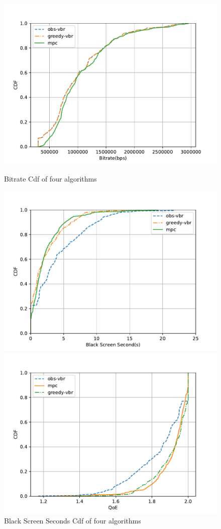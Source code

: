 \begin{figure}[htb]
  \includegraphics[width=\linewidth]{fig/massive-bitrate-cdf.pdf}
  \caption{Bitrate Cdf of four algorithms}
  \label{fig:vbr-bitrate-cdf}
\endminipage\hfill
{}
  \includegraphics[width=\linewidth]{fig/massive-drop-cdf.pdf}
  \caption{Black Screen Seconds Cdf of four algorithms}
  \label{fig:vbr-drop-cdf}
\endminipage
{}
  \includegraphics[width=\linewidth]{fig/massive-qoe-cdf.pdf}

\end{figure}

